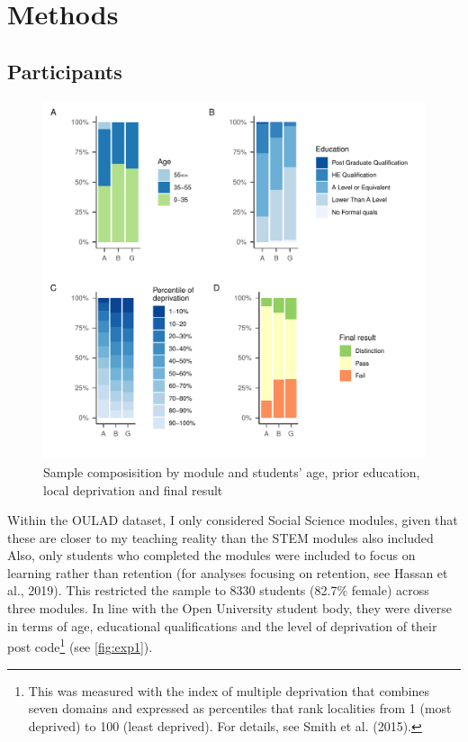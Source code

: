 \documentclass[
  english,
  man,mask,floatsintext]{apa6}
\begin{document}
\hypertarget{methods}{%
\section{Methods}\label{methods}}

\hypertarget{participants}{%
\subsection{Participants}\label{participants}}

\begin{figure}
\centering
\includegraphics{Assigment-2---OU-data_files/figure-latex/unnamed-chunk-1-1.pdf}
\caption{\label{fig:unnamed-chunk-1}Sample composisition by module and students' age, prior education, local deprivation and final result \label{fig:exp1}}
\end{figure}

Within the OULAD dataset, I only considered Social Science modules, given that these are closer to my teaching reality than the STEM modules also included Also, only students who completed the modules were included to focus on learning rather than retention (for analyses focusing on retention, see Hassan et al., 2019). This restricted the sample to 8330 students (82.7\% female) across three modules. In line with the Open University student body, they were diverse in terms of age, educational qualifications and the level of deprivation of their post code\footnote{This was measured with the index of multiple deprivation that combines seven domains and expressed as percentiles that rank localities from 1 (most deprived) to 100 (least deprived). For details, see Smith et al. (2015).} (see \autoref{fig:exp1}).
\end{document}

